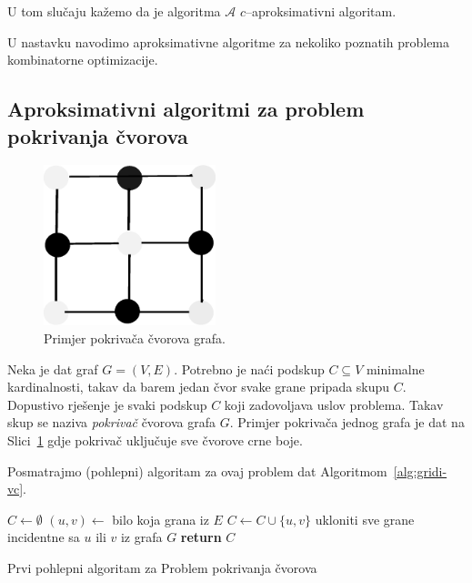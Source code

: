 \documentclass[a4paper, utf8, 11pt, colorlinks]{book}
\theoremstyle{definition}
\begin{document}
 U tom slučaju kažemo da je algoritma $\mathcal{A}$ $c$--aproksimativni algoritam.

  
  
   U nastavku navodimo  aproksimativne algoritme za nekoliko poznatih problema kombinatorne optimizacije. 
  
  \subsection{Aproksimativni algoritmi za problem pokrivanja čvorova}\label{sec:aprokspokrivanjecvorova}
  
    \begin{figure}
  	\centering
  	\includegraphics[width=50mm]{vertex-cover.eps}

  	\caption{Primjer pokrivača čvorova grafa.}   	\label{fig:vertex-cover}
  \end{figure}
  Neka je dat graf $G=(V,E)$. Potrebno je naći podskup $C\subseteq V$ minimalne kardinalnosti, takav da barem jedan čvor svake grane pripada skupu $C$.  Dopustivo rješenje je svaki podskup $C$ koji zadovoljava uslov problema. Takav skup se naziva \emph{pokrivač} čvorova grafa $G$. Primjer pokrivača jednog grafa je dat na Slici~\ref{fig:vertex-cover} gdje pokrivač uključuje sve čvorove crne boje. 
  

  
  Posmatrajmo (pohlepni) algoritam za ovaj problem dat Algoritmom~\ref{alg:gridi-vc}. 
  
  \begin{algorithm}[H] 
  	\begin{algorithmic}[1]
  		\STATE $C \gets \emptyset$
  		\STATE $(u,v) \gets$ bilo koja grana iz $E$
  		\STATE $C \gets C \cup \{u,v\}$
  		\STATE ukloniti sve grane incidentne sa  $u$ ili $v$ iz grafa $G$
  		\ENDWHILE
  		\STATE \textbf{return} $C$
  	\end{algorithmic}   
   
     \caption{Prvi pohlepni algoritam za Problem pokrivanja čvorova}
 \label{alg:gridi-vc}
  \end{algorithm}
  
\end{document}

